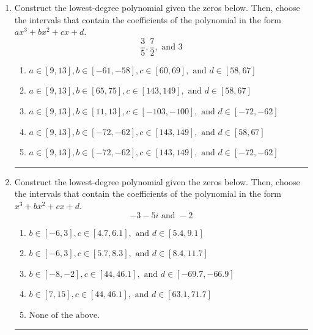 \documentclass[14pt]{extbook}
\newcommand{\litem}[1]{\item#1\hspace*{-1cm}\rule{\textwidth}{0.4pt}}
\begin{document}
\begin{enumerate}
{\begin{enumerate}[label=\Alph*.]
\end{enumerate} }
\litem{
Construct the lowest-degree polynomial given the zeros below. Then, choose the intervals that contain the coefficients of the polynomial in the form $ax^3+bx^2+cx+d$.\[ \frac{3}{5}, \frac{7}{2}, \text{ and } 3 \]\begin{enumerate}[label=\Alph*.]
\item \( a \in [9, 13], b \in [-61, -58], c \in [60, 69], \text{ and } d \in [58, 67] \)
\item \( a \in [9, 13], b \in [65, 75], c \in [143, 149], \text{ and } d \in [58, 67] \)
\item \( a \in [9, 13], b \in [11, 13], c \in [-103, -100], \text{ and } d \in [-72, -62] \)
\item \( a \in [9, 13], b \in [-72, -62], c \in [143, 149], \text{ and } d \in [58, 67] \)
\item \( a \in [9, 13], b \in [-72, -62], c \in [143, 149], \text{ and } d \in [-72, -62] \)

\end{enumerate} }
\litem{
Construct the lowest-degree polynomial given the zeros below. Then, choose the intervals that contain the coefficients of the polynomial in the form $x^3+bx^2+cx+d$.\[ -3 - 5 i \text{ and } -2 \]\begin{enumerate}[label=\Alph*.]
\item \( b \in [-6, 3], c \in [4.7, 6.1], \text{ and } d \in [5.4, 9.1] \)
\item \( b \in [-6, 3], c \in [5.7, 8.3], \text{ and } d \in [8.4, 11.7] \)
\item \( b \in [-8, -2], c \in [44, 46.1], \text{ and } d \in [-69.7, -66.9] \)
\item \( b \in [7, 15], c \in [44, 46.1], \text{ and } d \in [63.1, 71.7] \)
\item \( \text{None of the above.} \)


\end{enumerate}}
\end{enumerate}
\end{document}
